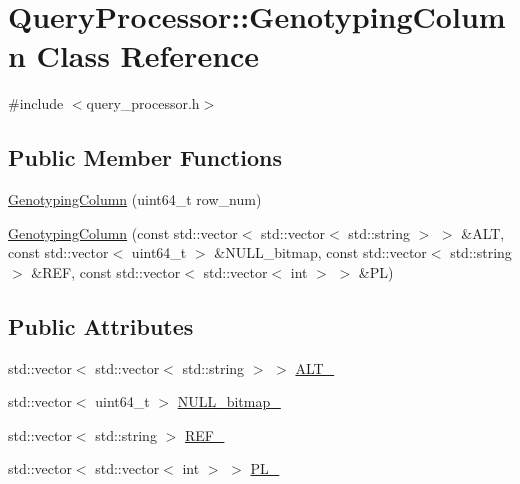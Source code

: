 \hypertarget{classQueryProcessor_1_1GenotypingColumn}{}\section{Query\+Processor\+:\+:Genotyping\+Column Class Reference}
\label{classQueryProcessor_1_1GenotypingColumn}


{\ttfamily \#include $<$query\+\_\+processor.\+h$>$}

\subsection*{Public Member Functions}
\begin{DoxyCompactItemize}
\item 
\hyperlink{classQueryProcessor_1_1GenotypingColumn_a0ad2487ead2aa79c57012d7d6ac569bb}{Genotyping\+Column} (uint64\+\_\+t row\+\_\+num)
\item 
\hyperlink{classQueryProcessor_1_1GenotypingColumn_ac210f6af2cc520ab0e4c0669e3fba7f1}{Genotyping\+Column} (const std\+::vector$<$ std\+::vector$<$ std\+::string $>$ $>$ \&A\+L\+T, const std\+::vector$<$ uint64\+\_\+t $>$ \&N\+U\+L\+L\+\_\+bitmap, const std\+::vector$<$ std\+::string $>$ \&R\+E\+F, const std\+::vector$<$ std\+::vector$<$ int $>$ $>$ \&P\+L)
\end{DoxyCompactItemize}
\subsection*{Public Attributes}
\begin{DoxyCompactItemize}
\item 
std\+::vector$<$ std\+::vector$<$ std\+::string $>$ $>$ \hyperlink{classQueryProcessor_1_1GenotypingColumn_aec7f08945b5b05cfca39e4ef4c5651f2}{A\+L\+T\+\_\+}
\item 
std\+::vector$<$ uint64\+\_\+t $>$ \hyperlink{classQueryProcessor_1_1GenotypingColumn_a895c204d340ac791de00899589ec3ee8}{N\+U\+L\+L\+\_\+bitmap\+\_\+}
\item 
std\+::vector$<$ std\+::string $>$ \hyperlink{classQueryProcessor_1_1GenotypingColumn_a87123c6d37332b7a1bf9f711d40ca473}{R\+E\+F\+\_\+}
\item 
std\+::vector$<$ std\+::vector$<$ int $>$ $>$ \hyperlink{classQueryProcessor_1_1GenotypingColumn_a761eca75934173f40473bf673aad68a6}{P\+L\+\_\+}
\end{DoxyCompactItemize}


